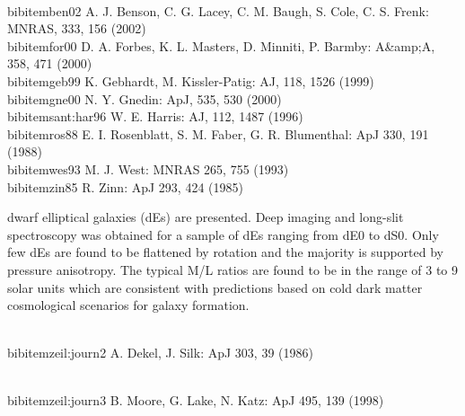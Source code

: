 \\bibitem{ben02} A. J. Benson, C. G. Lacey, C. M. Baugh, S. Cole,
C. S. Frenk: MNRAS, 333, 156 (2002)
\\bibitem{for00} D. A. Forbes, K. L. Masters, D. Minniti, P. Barmby: A&amp;A, 358, 471 (2000)
\\bibitem{geb99} K. Gebhardt, M. Kissler-Patig: AJ, 118, 1526 (1999)
\\bibitem{gne00} N. Y. Gnedin: ApJ, 535, 530 (2000)
\\bibitem{sant:har96} W. E. Harris: AJ, 112, 1487 (1996)
\\bibitem{ros88} E. I. Rosenblatt, S. M. Faber, G. R. Blumenthal: ApJ
330, 191 (1988)
\\bibitem{wes93} M. J. West: MNRAS 265, 755 (1993)
\\bibitem{zin85} R. Zinn: ApJ 293, 424 (1985)


dwarf elliptical galaxies (dEs) are presented. Deep imaging and
long-slit spectroscopy was obtained for a sample of dEs ranging from
dE0 to dS0. Only few dEs are found to be flattened by rotation and
the majority is supported by pressure anisotropy. The typical M/L
ratios are found to be in the range of 3 to 9 solar units which are
consistent with predictions based on cold dark matter cosmological
scenarios for galaxy formation.


\\bibitem{zeil:journ2} A. Dekel, J. Silk: ApJ 303, 39 (1986)

\\bibitem{zeil:journ3} B. Moore, G. Lake, N. Katz: ApJ 495, 139 (1998)

